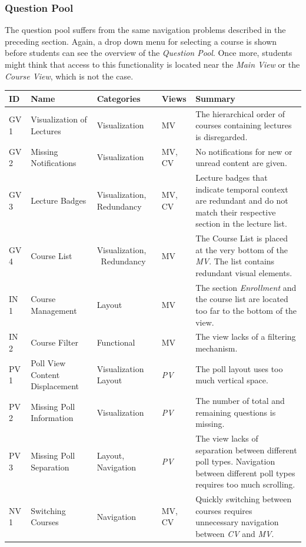 \subsubsection{Question Pool}

The question pool suffers from the same navigation problems described in the preceding section. Again, a drop down menu for selecting a course is shown before students can see the overview of the \emph{Question Pool}. Once more, students might think that access to this functionality is located near the \emph{Main View} or the \emph{Course View}, which is not the case.
\cleardoublepage
\renewcommand*{\arraystretch}{1.4}
\begin{small}
	\begin{longtable}{  p{0.8cm}  p{3cm}  p{2cm}  p{1.6cm}  p{5.8cm} }
		\hline
		ID & Name & Categories & Views & Summary \\ \hline
		GV 1 & Visualization of Lectures & Visualization & MV & The hierarchical order of courses containing lectures is disregarded. \\ 
		GV 2 & Missing Notifications & Visualization & MV,  CV & No notifications for new or unread content are given. \\ 
		GV 3 & Lecture Badges & Visualization,  Redundancy & MV,  CV & Lecture badges that indicate temporal context are redundant and do not match their respective section in the lecture list. \\ 
		GV 4 & Course List & Visualization, \ Redundancy & MV & The Course List is placed at the very bottom of the \emph{MV}. The list contains redundant visual elements. \\ 
		IN 1 & Course Management & Layout & MV & The section \emph{Enrollment} and the course list are located too far to the bottom of the view. \\ 
		IN 2 & Course Filter & Functional & MV & The view lacks of a filtering mechanism. \\ 
		PV 1 & Poll View Content Displacement & Visualization  Layout & \emph{PV} & The poll layout uses too much vertical space. \\ 
		PV 2 & Missing Poll Information & Visualization & \emph{PV} & The number of total and remaining questions is missing. \\ 
		PV 3 & Missing Poll Separation & Layout,  Navigation & \emph{PV} & The view lacks of separation between different poll types. Navigation between different poll types requires too much scrolling. \\ 
		NV 1 & Switching Courses & Navigation & MV,  CV & Quickly switching between courses requires unnecessary navigation between \emph{CV} and \emph{MV}. \\     

\end{longtable}
\end{small}

